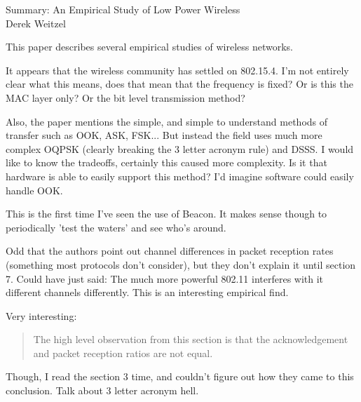 \documentclass[12pt]{article}
\begin{document}
\begin{center}
{\huge Summary: An Empirical Study of Low Power Wireless } \\
Derek Weitzel
\end{center}

This paper describes several empirical studies of wireless networks.

It appears that the wireless community has settled on 802.15.4.  I'm not entirely clear what this means, does that mean that the frequency is fixed?  Or is this the MAC layer only?  Or the bit level transmission method?  

Also, the paper mentions the simple, and simple to understand methods of transfer such as OOK, ASK, FSK...  But instead the field uses much more complex OQPSK (clearly breaking the 3 letter acronym rule) and DSSS.  I would like to know the tradeoffs, certainly this caused more complexity.  Is it that hardware is able to easily support this method?  I'd imagine software could easily handle OOK.

This is the first time I've seen the use of Beacon.  It makes sense though to periodically 'test the waters' and see who's around.

Odd that the authors point out channel differences in packet reception rates (something most protocols don't consider), but they don't explain it until section 7.  Could have just said: The much more powerful 802.11 interferes with it different channels differently.  This is an interesting empirical find. 

Very interesting:
\begin{quote}
The high level observation from this section is that the acknowledgement and packet reception ratios are not equal.
\end{quote}
Though, I read the section 3 time, and couldn't figure out how they came to this conclusion.  Talk about 3 letter acronym hell.
\end{document}

